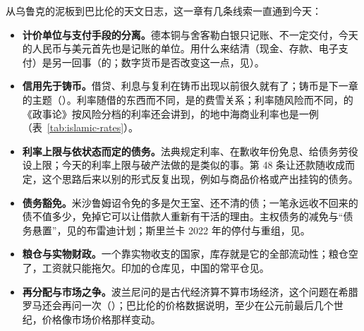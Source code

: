 从乌鲁克的泥板到巴比伦的天文日志，这一章有几条线索一直通到今天：
\begin{itemize}
\item \textbf{计价单位与支付手段的分离。}德本铜与舍客勒白银只记账、不一定交付，今天的人民币与美元首先也是记账的单位。用什么来结清（现金、存款、电子支付）是另一回事（的；数字货币是否改变这一点，见）。

\item \textbf{信用先于铸币。}借贷、利息与复利在铸币出现以前很久就有了；铸币是下一章的主题（）。利率随借的东西而不同，是的费雪关系；利率随风险而不同，的《政事论》按风险分档的利率还会讲到，的地中海商业利率也是一例（表~\ref{tab:islamic-rates}）。

\item \textbf{利率上限与依状态而定的债务。}法典规定利率、在歉收年份免息、给债务劳役设上限；今天的利率上限与破产法做的是类似的事。第 48 条让还款随收成而定，这个思路后来以别的形式反复出现，例如与商品价格或产出挂钩的债务。

\item \textbf{债务豁免。}米沙鲁姆诏令免的多是欠王室、还不清的债；一笔永远收不回来的债不值多少，免掉它可以让借款人重新有干活的理由。主权债务的减免与“债务悬置”，见的布雷迪计划；斯里兰卡 2022 年的停付与重组，见。

\item \textbf{粮仓与实物财政。}一个靠实物收支的国家，库存就是它的全部流动性；粮仓空了，工资就只能拖欠。印加的仓库见，中国的常平仓见。

\item \textbf{再分配与市场之争。}波兰尼问的是古代经济算不算市场经济，这个问题在希腊罗马还会再问一次（）；巴比伦的价格数据说明，至少在公元前最后几个世纪，价格像市场价格那样变动。
\end{itemize}

